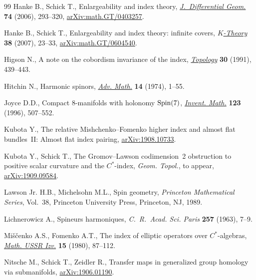 \documentclass[pdftex]{sigma}
\numberwithin{equation}{section}
\begin{document}
\begin{thebibliography}{99}
Hanke B., Schick T., Enlargeability and index theory, \href{https://doi.org/10.4310/jdg/1175266206}{\textit{J.~Differential
 Geom.}} \textbf{74} (2006), 293--320, \href{https://arxiv.org/abs/math.GT/0403257}{arXiv:math.GT/0403257}.

Hanke B., Schick T., Enlargeability and index theory: infinite covers,
 \href{https://doi.org/10.1007/s10977-007-9004-3}{\textit{$K$-Theory}} \textbf{38} (2007), 23--33, \href{https://arxiv.org/abs/math.GT/0604540}{arXiv:math.GT/0604540}.

Higson N., A note on the cobordism invariance of the index, \href{https://doi.org/10.1016/0040-9383(91)90024-X}{\textit{Topology}}
 \textbf{30} (1991), 439--443.

Hitchin N., Harmonic spinors, \href{https://doi.org/10.1016/0001-8708(74)90021-8}{\textit{Adv. Math.}} \textbf{14} (1974), 1--55.

Joyce D.D., Compact {$8$}-manifolds with holonomy {${\rm Spin}(7)$},
 \href{https://doi.org/10.1007/s002220050039}{\textit{Invent. Math.}} \textbf{123} (1996), 507--552.

Kubota Y., The relative {M}ishchenko--{F}omenko higher index and almost flat
 bundles~{II}: {A}lmost flat index pairing, \href{https://arxiv.org/abs/1908.10733}{arXiv:1908.10733}.

Kubota Y., Schick T., The {G}romov--{L}awson codimension~2 obstruction to
 positive scalar curvature and the {$C^*$}-index, \textit{Geom. Topol.}, {t}o
 appear, \href{https://arxiv.org/abs/1909.09584}{arXiv:1909.09584}.

Lawson Jr. H.B., Michelsohn M.L., Spin geometry, \textit{Princeton Mathematical
 Series}, Vol.~38, Princeton University Press, Princeton, NJ, 1989.

Lichnerowicz A., Spineurs harmoniques, \textit{C.~R.~Acad. Sci. Paris}
 \textbf{257} (1963), 7--9.

Mi\v{s}\v{c}enko A.S., Fomenko A.T., The index of elliptic operators over
 {$C^{\ast} $}-algebras, \href{https://doi.org/10.1070/IM1980v015n01ABEH001207}{\textit{Math. USSR Izv.}} \textbf{15} (1980), 87--112.

Nitsche M., Schick T., Zeidler R., Transfer maps in generalized group homology
 via submanifolds, \href{https://arxiv.org/abs/1906.01190}{arXiv:1906.01190}.


\end{thebibliography}
\end{document}
